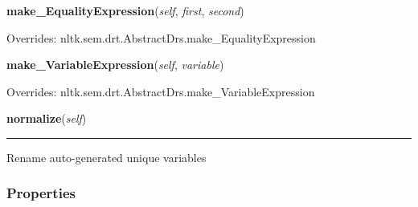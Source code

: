     \vspace{0.5ex}

\hspace{.8\funcindent}\begin{boxedminipage}{\funcwidth}

    \raggedright \textbf{make\_EqualityExpression}(\textit{self}, \textit{first}, \textit{second})

\setlength{\parskip}{2ex}
\setlength{\parskip}{1ex}
      Overrides: nltk.sem.drt.AbstractDrs.make\_EqualityExpression

    \end{boxedminipage}

    \vspace{0.5ex}

\hspace{.8\funcindent}\begin{boxedminipage}{\funcwidth}

    \raggedright \textbf{make\_VariableExpression}(\textit{self}, \textit{variable})

\setlength{\parskip}{2ex}
\setlength{\parskip}{1ex}
      Overrides: nltk.sem.drt.AbstractDrs.make\_VariableExpression

    \end{boxedminipage}

    \label{temporaldrt:AbstractDrs:normalize}

    \vspace{0.5ex}

\hspace{.8\funcindent}\begin{boxedminipage}{\funcwidth}

    \raggedright \textbf{normalize}(\textit{self})

    \vspace{-1.5ex}

    \rule{\textwidth}{0.5\fboxrule}
\setlength{\parskip}{2ex}
    Rename auto-generated unique variables

\setlength{\parskip}{1ex}
    \end{boxedminipage}



  \subsubsection{Properties}

